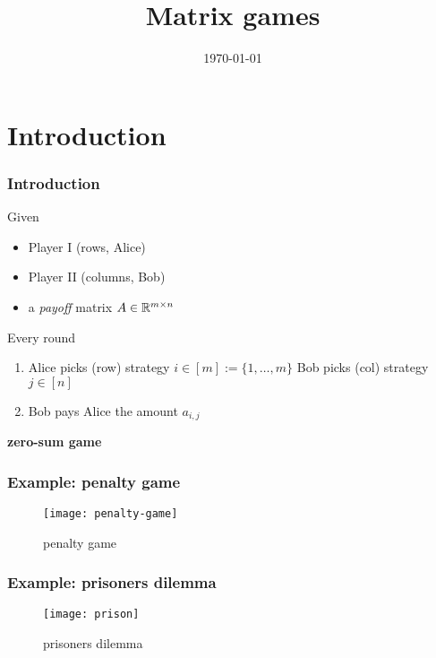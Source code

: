 \documentclass[aspectratio=149]{beamer}
\title{Matrix games}
\date{\today}
\begin{document}
\maketitle
\frame{\tableofcontents}

\section{Introduction}%

\begin{frame}
  \frametitle{Introduction}
  Given
  \begin{itemize}
    \item Player I (rows, Alice)
          \item Player II (columns, Bob)
          \item a \emph{payoff} matrix $A \in \mathbb{R}^{m \times n}$
  \end{itemize}
  Every round
  \begin{enumerate}
    \item Alice picks (row) strategy $i\in [m]:= \{1,\dots, m\}$
          Bob picks (col) strategy $j\in [n]$
    \item Bob pays Alice the amount $a_{i,j}$
  \end{enumerate}
  \begin{center}
    \textbf{zero-sum game}
  \end{center}
\end{frame}

\begin{frame}
  \frametitle{Example: penalty game}
  \begin{figure}[ht]
    \centering
    \texttt{[image: penalty-game]}
    \caption{penalty game}
  \end{figure}
\end{frame}

\begin{frame}
  \frametitle{Example: prisoners dilemma}
  \begin{figure}[ht]
    \centering
    \texttt{[image: prison]}
    \caption{prisoners dilemma}
  \end{figure}
\end{frame}
\end{document}
